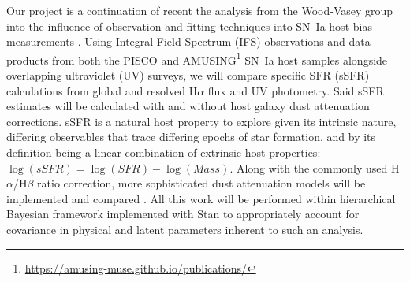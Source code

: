 \documentclass[modern]{aastex63}
\begin{document}
Our project is a continuation of recent the analysis from the Wood-Vasey group into the influence of observation and fitting techniques into SN~Ia host bias measurements \citep{Hand2021}.
Using Integral Field Spectrum (IFS) observations and data products from both the PISCO \citep{Galbany2018} and AMUSING\footnote{\url{https://amusing-muse.github.io/publications/}} SN~Ia host samples alongside overlapping ultraviolet (UV) surveys, we will compare specific SFR (sSFR) calculations from global and resolved H$\alpha$ flux and UV photometry.
Said sSFR estimates will be calculated with and without host galaxy dust attenuation corrections.
sSFR is a natural host property to explore given its intrinsic nature, differing observables that trace differing epochs of star formation, and by its definition being a linear combination of extrinsic host properties: $\log(sSFR) = \log(SFR) - \log(Mass)$.
Along with the commonly used H$\alpha$/H$\beta$ ratio correction, more sophisticated dust attenuation models will be implemented and compared \citep{Salim2018,Narayanan2018}.  
All this work will be performed within hierarchical Bayesian framework implemented with Stan to appropriately account for covariance in physical and latent parameters inherent to such an analysis.



\end{document}
